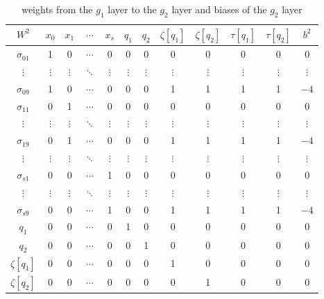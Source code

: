 \begin{table}[p]
	\centering
	\begin{tabular}{|c| c c c c c c c c c c |c|}
		\hline 
		$W^2$ & $x_0$ & $x_1$ & $\cdots$ & $x_s$ & $q_1$ & $q_2$ & $\zeta[q_1]$ & $\zeta[q_2]$ & $\tau[q_1]$ & $\tau[q_2]$ & $b^2$ \\
		\hline
		$\sigma_{01}$ & 1 & 0 & $\cdots$ & 0 & 0 & 0 & 0 & 0 & 0 & 0 & 0 \\
		$\vdots$ & $\vdots$ & $\vdots$ & $\ddots$ & $\vdots$ & $\vdots$ & $\vdots$ & $\vdots$ & $\vdots$ & $\vdots$ & $\vdots$ & $\vdots$ \\
		$\sigma_{09}$ & 1 & 0 & $\cdots$ & 0 & 0 & 0 & 1 & 1 & 1 & 1 & $-4$ \\
		$\sigma_{11}$ & 0 & 1 & $\cdots$ & 0 & 0 & 0 & 0 & 0 & 0 & 0 & 0 \\
		$\vdots$ & $\vdots$ & $\vdots$ & $\ddots$ & $\vdots$ & $\vdots$ & $\vdots$ & $\vdots$ & $\vdots$ & $\vdots$ & $\vdots$ & $\vdots$ \\
		$\sigma_{19}$ & 0 & 1 & $\cdots$ & 0 & 0 & 0 & 1 & 1 & 1 & 1 & $-4$ \\
		$\vdots$ & $\vdots$ & $\vdots$ & $\ddots$ & $\vdots$ & $\vdots$ & $\vdots$ & $\vdots$ & $\vdots$ & $\vdots$ & $\vdots$ & $\vdots$ \\
		$\sigma_{s1}$ & 0 & 0 & $\cdots$ & 1 & 0 & 0 & 0 & 0 & 0 & 0 & 0 \\
		$\vdots$ & $\vdots$ & $\vdots$ & $\ddots$ & $\vdots$ & $\vdots$ & $\vdots$ & $\vdots$ & $\vdots$ & $\vdots$ & $\vdots$ & $\vdots$ \\
		$\sigma_{s9}$ & 0 & 0 & $\cdots$ & 1 & 0 & 0 & 1 & 1 & 1 & 1 & $-4$ \\
		$q_1$ & 0 & 0 & $\cdots$ & 0 & 1 & 0 & 0 & 0 & 0 & 0 & 0 \\
		$q_2$ & 0 & 0 & $\cdots$ & 0 & 0 & 1 & 0 & 0 & 0 & 0 & 0 \\
		$\zeta[q_1]$ & 0 & 0 & $\cdots$ & 0 & 0 & 0 & 1 & 0 & 0 & 0 & 0 \\
		$\zeta[q_2]$ & 0 & 0 & $\cdots$ & 0 & 0 & 0 & 0 & 1 & 0 & 0 & 0 \\
		\hline
	\end{tabular}
	\caption{weights from the $g_1$ layer to the $g_2$ layer and biases of the $g_2$ layer}
	\label{tab:W2b2}
\end{table}